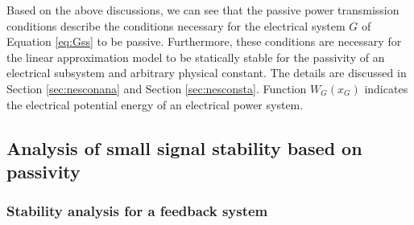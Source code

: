 \documentclass[tombow,dvipdfmx]{corona-a5-1.1}
\begin{document}
Based on the above discussions, we can see that the passive power transmission conditions describe the conditions necessary for the electrical system $G$ of Equation \ref{eq:Gss} to be passive.
Furthermore, these conditions are necessary for the linear approximation model to be statically stable for the passivity of an electrical subsystem and arbitrary physical constant.
The details are discussed in Section \ref{sec:nesconana} and Section \ref{sec:nesconsta}.
Function $W_G(x_G)$ indicates the electrical potential energy of an electrical power system.

\subsection{Analysis of small signal stability based on passivity\advanced}

\smallskip
\subsubsection{Stability analysis for a feedback system}
\end{document}
